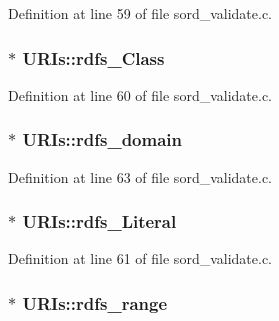 Definition at line 59 of file sord\+\_\+validate.\+c.

\subsubsection[{\texorpdfstring{rdfs\+\_\+\+Class}{rdfs_Class}}]{$\ast$ U\+R\+Is\+::rdfs\+\_\+\+Class}\hypertarget{struct_u_r_is_ae5faded8ca60f71df0632a83a51ef5b0}{}\label{struct_u_r_is_ae5faded8ca60f71df0632a83a51ef5b0}


Definition at line 60 of file sord\+\_\+validate.\+c.

\subsubsection[{\texorpdfstring{rdfs\+\_\+domain}{rdfs_domain}}]{$\ast$ U\+R\+Is\+::rdfs\+\_\+domain}\hypertarget{struct_u_r_is_ad790819c3f148cd3ff055e431ed87dc2}{}\label{struct_u_r_is_ad790819c3f148cd3ff055e431ed87dc2}


Definition at line 63 of file sord\+\_\+validate.\+c.

\subsubsection[{\texorpdfstring{rdfs\+\_\+\+Literal}{rdfs_Literal}}]{$\ast$ U\+R\+Is\+::rdfs\+\_\+\+Literal}\hypertarget{struct_u_r_is_ae93fd7459d8d97f6d691b004a3ff2dd8}{}\label{struct_u_r_is_ae93fd7459d8d97f6d691b004a3ff2dd8}


Definition at line 61 of file sord\+\_\+validate.\+c.

\subsubsection[{\texorpdfstring{rdfs\+\_\+range}{rdfs_range}}]{$\ast$ U\+R\+Is\+::rdfs\+\_\+range}\hypertarget{struct_u_r_is_a3a8887f6f239899c5872f8d85f0be053}{}\label{struct_u_r_is_a3a8887f6f239899c5872f8d85f0be053}



